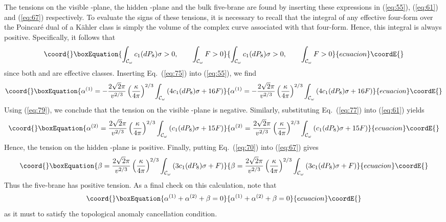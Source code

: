 \documentclass[a4paper,12pt]{article}
\numberwithin{equation}{section}
\theoremstyle{plain}
\begin{document}
The tensions on the visible \coordHE{}-plane, the hidden
\coordHE{}-plane and the bulk five-brane are found by inserting these expressions in 
(\ref{eq:55}), (\ref{eq:61}) and (\ref{eq:67}) respectively. To evaluate the
signs of these tensions, it is necessary to recall that the integral of any 
effective four-form over the Poincar\'e dual of a K\"{a}hler class is simply the
volume of the complex curve associated with that four-form. Hence, this
integral is always positive. Specifically, it follows that
%
\begin{equation}\coord{}\boxEquation{
\int_{{\cal{C}}_{\omega}}{c_{1}(dP_{8})\sigma}>0, \qquad 
\int_{{\cal{C}}_{\omega}}{F}>0
\label{eq:79}
}{
\int_{{\cal{C}}_{\omega}}{c_{1}(dP_{8})\sigma}>0, \qquad 
\int_{{\cal{C}}_{\omega}}{F}>0
}{ecuacion}\coordE{}\end{equation}
%
since both \coordHE{} and \coordHE{} are effective classes. Inserting
Eq.~(\ref{eq:75}) into (\ref{eq:55}), we find 
%
\begin{equation}\coord{}\boxEquation{
\alpha^{(1)}=-\frac{2\sqrt{2}\pi}{v^{2/3}}\left(\frac{\kappa}{4\pi}\right)^{2/3}
\int_{{\cal{C}}_{\omega}}{(4c_{1}(dP_{8})\sigma +16F)}
\label{eq:80}
}{
\alpha^{(1)}=-\frac{2\sqrt{2}\pi}{v^{2/3}}\left(\frac{\kappa}{4\pi}\right)^{2/3}
\int_{{\cal{C}}_{\omega}}{(4c_{1}(dP_{8})\sigma +16F)}
}{ecuacion}\coordE{}\end{equation}
%
Using (\ref{eq:79}), we conclude that the tension on the visible 
\coordHE{}-plane is negative. Similarly, substituting Eq.~(\ref{eq:77}) 
into (\ref{eq:61}) yields
%
\begin{equation}\coord{}\boxEquation{
\alpha^{(2)}=\frac{2\sqrt{2}\pi}{v^{2/3}}\left(\frac{\kappa}{4\pi}\right)^{2/3}
\int_{{\cal{C}}_{\omega}}{(c_{1}(dP_{8})\sigma +15F)}
\label{eq:81}
}{
\alpha^{(2)}=\frac{2\sqrt{2}\pi}{v^{2/3}}\left(\frac{\kappa}{4\pi}\right)^{2/3}
\int_{{\cal{C}}_{\omega}}{(c_{1}(dP_{8})\sigma +15F)}
}{ecuacion}\coordE{}\end{equation}
%
Hence, the tension on the hidden \coordHE{}-plane is positive. Finally,
putting Eq.~(\ref{eq:70}) into (\ref{eq:67}) gives
%
\begin{equation}\coord{}\boxEquation{
\beta=\frac{2\sqrt{2}\pi}{v^{2/3}}\left(\frac{\kappa}{4\pi}\right)^{2/3}
\int_{{\cal{C}}_{\omega}}{(3c_{1}(dP_{8})\sigma+F)}
\label{eq:82}
}{
\beta=\frac{2\sqrt{2}\pi}{v^{2/3}}\left(\frac{\kappa}{4\pi}\right)^{2/3}
\int_{{\cal{C}}_{\omega}}{(3c_{1}(dP_{8})\sigma+F)}
}{ecuacion}\coordE{}\end{equation}
%
Thus the five-brane has positive tension. As a final check on this
calculation, note that 
%
\begin{equation}\coord{}\boxEquation{
\alpha^{(1)}+\alpha^{(2)}+ \beta=0
\label{eq:83}
}{
\alpha^{(1)}+\alpha^{(2)}+ \beta=0
}{ecuacion}\coordE{}\end{equation}
%
as it must to satisfy the topological anomaly cancellation condition.
\end{document}
